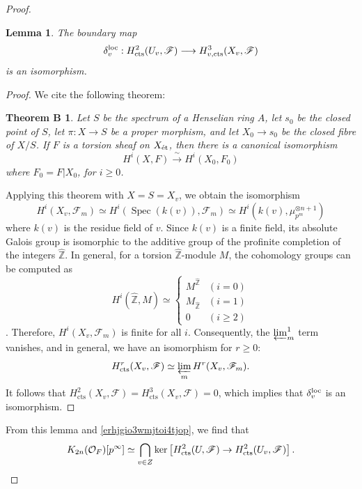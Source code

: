 \documentclass{article}
\numberwithin{equation}{section} %
\newtheorem*{themB}{Theorem B}
\newtheorem{lemm}{Lemma}[section]
\begin{document}
\begin{proof}
            \begin{lemm}
  The boundary map
  \[
    \delta_v^{\rm loc}: H^2_{\mathrm{cts}}(U_v,\mathscr{F}) \longrightarrow H^3_{v,\mathrm{cts}}(X_v,\mathscr{F})
  \]
  is an isomorphism.
\end{lemm}

\begin{proof}
  We cite the following theorem:

  \begin{themB}
    Let $S$ be the spectrum of a Henselian ring $A$, let $s_0$ be the closed point of $S$, let $\pi: X \to S$ be a proper morphism, and let $X_0 \to s_0$ be the closed fibre of $X/S$. If $F$ is a torsion sheaf on $X_{\rm \acute{e}t}$, then there is a canonical isomorphism
    \[
      H^i(X,F) \xrightarrow{\; \sim \;} H^i(X_0,F_0)
    \]
    where $F_0 = F|X_0$, for $i \geq 0$. \cite[Corollary 2.7]{Milne}
  \end{themB}

  Applying this theorem with $X = S = X_v$, we obtain the isomorphism
  \[
    H^i(X_v,\mathscr{F}_m) \simeq H^i(\operatorname{Spec}(k(v)),\mathscr{F}_m) \simeq H^i(k(v),\mu_{p^m}^{\otimes n+1})
  \]
  where $k(v)$ is the residue field of $v$. Since $k(v)$ is a finite field, its absolute Galois group is isomorphic to the additive group of the profinite completion of the integers $\widehat{\mathbb{Z}}$. In general, for a torsion $\widehat{\mathbb{Z}}$-module $M$, the cohomology groups can be computed as
  \[
    H^i(\widehat{\mathbb{Z}},M) \simeq \begin{cases}
        M^{\widehat{\mathbb{Z}}} & (i = 0) \\
        M_{\widehat{\mathbb{Z}}} & (i = 1) \\
        0 & (i \geq 2)
    \end{cases}
  \]
  \cite[Proposition 1.7.7]{NSW}. Therefore, $H^i(X_v,\mathscr{F}_{m})$ is finite for all $i$. Consequently, the $\varprojlim\nolimits_m^1$ term vanishes, and in general, we have an isomorphism for $r \geq 0$:
  \[
    H^r_{\rm cts}(X_v, \mathscr{F}) \simeq \varprojlim_m H^r(X_v,\mathscr{F}_{m}).
  \]
  It follows that $H^2_{\mathrm{cts}}(X_v,\mathscr{F}) = H^3_{\mathrm{cts}}(X_v,\mathscr{F}) = 0$, which implies that $\delta_v^{\rm loc}$ is an isomorphism.
\end{proof}

From this lemma and \eqref{erhjgio3wmjtoi4tjop}, we find that
\begin{equation}
    \label{dsrgtin4wntontioemrtoa}
  K_{2n}(\mathcal{O}_F)[p^\infty] \simeq \bigcap_{v \in Z}\operatorname{ker}\left[H^2_{\rm cts}(U,\mathscr{F}) \to H^2_{\rm cts}(U_v,\mathscr{F})\right]. 
\end{equation}


\end{proof}
\end{document}

